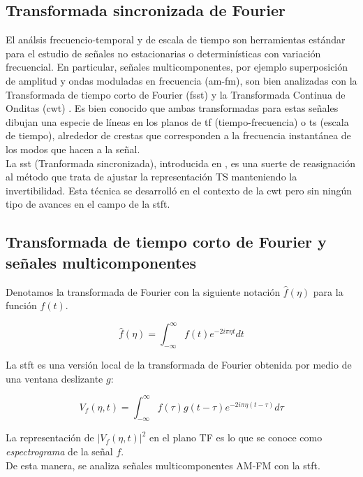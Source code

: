 \subsection*{Transformada sincronizada de Fourier}

El análsis frecuencio-temporal y de escala de tiempo son herramientas estándar para el estudio de señales no
estacionarias o determinísticas con variación frecuencial. En particular, señales multicomponentes, por ejemplo
superposición de amplitud y ondas moduladas en frecuencia (\acrshort{am}-\acrshort{fm}), son bien analizadas con la
Transformada de tiempo corto de Fourier (\acrshort{fsst}) \cite{ref:gabor} y la Transformada Continua de Onditas
(\acrshort{cwt}) \cite{ref:grossmann-morlet}. Es bien conocido que ambas transformadas para estas señales dibujan
una especie de líneas en los planos de \acrshort{tf} (tiempo-frecuencia) o \acrshort{ts} (escala de tiempo),
alrededor de crestas que corresponden a la frecuencia instantánea de los modos que hacen a la señal. \\
\indent La \acrshort{sst} (Tranformada sincronizada), introducida en \cite{ref:daubechies-maes}, es una suerte de
reasignación al método que trata de ajustar la representación TS manteniendo la invertibilidad. Esta técnica se
desarrolló en el contexto de la \acrshort{cwt} pero sin ningún tipo de avances en el campo de la \acrshort{stft}.

\subsection*{Transformada de tiempo corto de Fourier y señales multicomponentes}

\indent Denotamos la transformada de Fourier con la siguiente notación $\hat{f}(\eta)$ para la función $f(t)$.

\begin{equation}
  \hat{f}(\eta) = \int_{-\infty}^\infty f(t)e^{-2i\pi\eta t}dt
\end{equation}

\indent La \acrshort{stft} es una versión local de la transformada de Fourier obtenida por medio de una ventana
deslizante $g$:

\begin{equation}
  V_f(\eta,t) = \int_{-\infty}^\infty f(\tau)g(t-\tau)e^{-2i\pi\eta (t-\tau)}d\tau
\end{equation}

\indent La representación de $|V_f(\eta,t)|^2$ en el plano TF es lo que se conoce como \textit{espectrograma} de la
señal $f$. \\
\indent De esta manera, se analiza señales multicomponentes AM-FM con la \acrshort{stft}.

